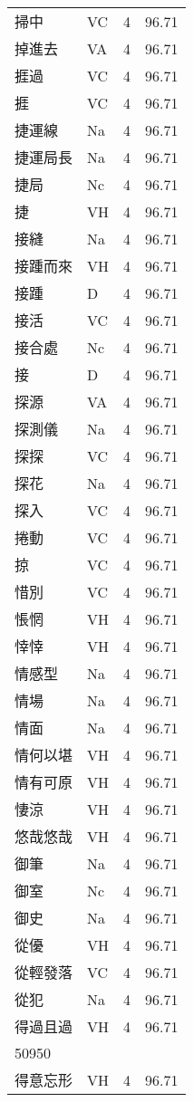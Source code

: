 \documentclass[twocolumn]{book}
\begin{document}
\begin{supertabular}{llrr}
掃中 & VC & 4 &  96.71\\
掉進去 & VA & 4 &  96.71\\
捱過 & VC & 4 &  96.71\\
捱 & VC & 4 &  96.71\\
捷運線 & Na & 4 &  96.71\\
捷運局長 & Na & 4 &  96.71\\
捷局 & Nc & 4 &  96.71\\
捷 & VH & 4 &  96.71\\
接縫 & Na & 4 &  96.71\\
接踵而來 & VH & 4 &  96.71\\
接踵 & D & 4 &  96.71\\
接活 & VC & 4 &  96.71\\
接合處 & Nc & 4 &  96.71\\
接 & D & 4 &  96.71\\
探源 & VA & 4 &  96.71\\
探測儀 & Na & 4 &  96.71\\
探探 & VC & 4 &  96.71\\
探花 & Na & 4 &  96.71\\
探入 & VC & 4 &  96.71\\
捲動 & VC & 4 &  96.71\\
掠 & VC & 4 &  96.71\\
惜別 & VC & 4 &  96.71\\
悵惘 & VH & 4 &  96.71\\
悻悻 & VH & 4 &  96.71\\
情感型 & Na & 4 &  96.71\\
情場 & Na & 4 &  96.71\\
情面 & Na & 4 &  96.71\\
情何以堪 & VH & 4 &  96.71\\
情有可原 & VH & 4 &  96.71\\
悽涼 & VH & 4 &  96.71\\
悠哉悠哉 & VH & 4 &  96.71\\
御筆 & Na & 4 &  96.71\\
御室 & Nc & 4 &  96.71\\
御史 & Na & 4 &  96.71\\
從優 & VH & 4 &  96.71\\
從輕發落 & VC & 4 &  96.71\\
從犯 & Na & 4 &  96.71\\
得過且過 & VH & 4 &  96.71\\
50950\\
得意忘形 & VH & 4 &  96.71\\

\end{supertabular}
\end{document}
